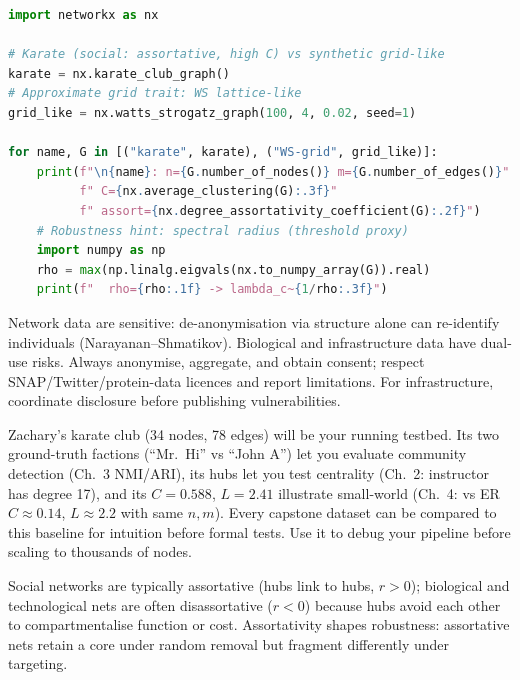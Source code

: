\begin{lstlisting}[language=Python, caption={Cross-domain comparison: karate (social) vs power grid (tech).}, label={lst:cross-domain}]
import networkx as nx

# Karate (social: assortative, high C) vs synthetic grid-like
karate = nx.karate_club_graph()
# Approximate grid trait: WS lattice-like
grid_like = nx.watts_strogatz_graph(100, 4, 0.02, seed=1)

for name, G in [("karate", karate), ("WS-grid", grid_like)]:
    print(f"\n{name}: n={G.number_of_nodes()} m={G.number_of_edges()}"
          f" C={nx.average_clustering(G):.3f}"
          f" assort={nx.degree_assortativity_coefficient(G):.2f}")
    # Robustness hint: spectral radius (threshold proxy)
    import numpy as np
    rho = max(np.linalg.eigvals(nx.to_numpy_array(G)).real)
    print(f"  rho={rho:.1f} -> lambda_c~{1/rho:.3f}")
\end{lstlisting}

\begin{remark}\label{rem:ethics}
Network data are sensitive: de-anonymisation via structure alone can re-identify individuals (Narayanan--Shmatikov). Biological and infrastructure data have dual-use risks. Always anonymise, aggregate, and obtain consent; respect SNAP/Twitter/protein-data licences and report limitations. For infrastructure, coordinate disclosure before publishing vulnerabilities.
\end{remark}

\begin{example}\label{ex:karate}
Zachary's karate club (34 nodes, 78 edges) will be your running testbed. Its two ground-truth factions (``Mr.~Hi'' vs ``John A'') let you evaluate community detection (Ch.~3 NMI/ARI), its hubs let you test centrality (Ch.~2: instructor has degree 17), and its $C=0.588$, $L=2.41$ illustrate small-world (Ch.~4: vs ER $C\approx0.14$, $L\approx2.2$ with same $n,m$). Every capstone dataset can be compared to this baseline for intuition before formal tests. Use it to debug your pipeline before scaling to thousands of nodes.
\end{example}

\begin{remark}\label{rem:assortativity}
Social networks are typically assortative (hubs link to hubs, $r>0$); biological and technological nets are often disassortative ($r<0$) because hubs avoid each other to compartmentalise function or cost. Assortativity shapes robustness: assortative nets retain a core under random removal but fragment differently under targeting.
\end{remark}

